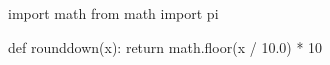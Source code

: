 \begin{pycode}
  import math
from math import pi

def rounddown(x):
    return math.floor(x / 10.0) * 10


\end{pycode}